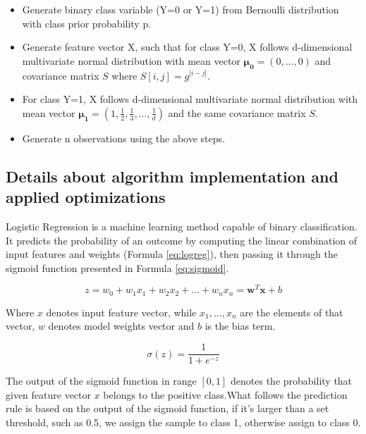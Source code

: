 \documentclass[12pt]{article}
\begin{document}
\begin{itemize}
    \item Generate binary class variable (Y=0 or Y=1) from Bernoulli distribution with class prior probability p.
    \item Generate feature vector X, such that for class Y=0, X follows d-dimensional multivariate normal distribution with mean vector $\boldsymbol{\mu_0} = (0,\dots,0)$ and covariance matrix $S$ where $S[i,j] = g^{|i-j|}$.
    \item For class Y=1, X follows d-dimensional multivariate normal distribution with mean vector $\boldsymbol{\mu_1} = (1,\frac{1}{2},\frac{1}{3},\dots,\frac{1}{d})$ and the same covariance matrix $S$.
    \item Generate n observations using the above steps.
\end{itemize}


\subsection{Details about algorithm implementation and applied optimizations}


Logistic Regression is a machine learning method capable of binary classification. It predicts the probability of an outcome by computing the linear combination of input features and weights (Formula \ref{eq:logreg}), then passing it through the sigmoid function presented in Formula \ref{eq:sigmoid}. 

\begin{equation}\label{eq:logreg}
    z = w_0 + w_1 x_1 + w_2 x_2 + \dots + w_n x_n = \mathbf{w}^T \mathbf{x} + b    
\end{equation}


Where $x$ denotes input feature vector, while $x_1,...,x_n$ are the elements of that vector, $w$ denotes model weights vector and $b$ is the bias term.  



\begin{equation}\label{eq:sigmoid}
    \sigma(z) = \frac{1}{1 + e^{-z}}
\end{equation}

The output of the sigmoid function in range $[0,1]$ denotes the probability that given feature vector $x$ belongs to the positive class.What follows the prediction rule is based on the output of the sigmoid function, if it's larger than a set threshold, such as 0.5, we assign the sample to class 1, otherwise assign to class 0.
\end{document}
